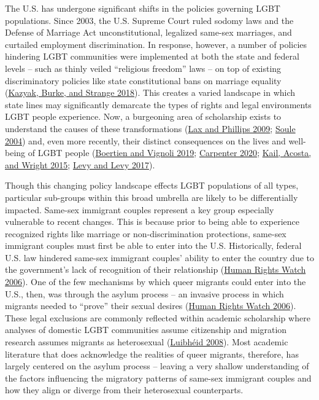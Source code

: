 \documentclass[
  11pt,
]{article}
\begin{document}
The U.S. has undergone significant shifts in the policies governing LGBT populations. Since 2003, the U.S. Supreme Court ruled sodomy laws and the Defense of Marriage Act unconstitutional, legalized same-sex marriages, and curtailed employment discrimination. In response, however, a number of policies hindering LGBT communities were implemented at both the state and federal levels -- such as thinly veiled ``religious freedom'' laws -- on top of existing discriminatory policies like state constitutional bans on marriage equality (\protect\hyperlink{ref-kazyak_2018}{Kazyak, Burke, and Strange 2018}). This creates a varied landscape in which state lines may significantly demarcate the types of rights and legal environments LGBT people experience. Now, a burgeoning area of scholarship exists to understand the causes of these transformations (\protect\hyperlink{ref-lax_2009}{Lax and Phillips 2009}; \protect\hyperlink{ref-soule_2004}{Soule 2004}) and, even more recently, their distinct consequences on the lives and well-being of LGBT people (\protect\hyperlink{ref-boertien_2019}{Boertien and Vignoli 2019}; \protect\hyperlink{ref-carpenter_2020}{Carpenter 2020}; \protect\hyperlink{ref-kail_2015}{Kail, Acosta, and Wright 2015}; \protect\hyperlink{ref-levy_2017}{Levy and Levy 2017}).

Though this changing policy landscape effects LGBT populations of all types, particular sub-groups within this broad umbrella are likely to be differentially impacted. Same-sex immigrant couples represent a key group especially vulnerable to recent changes. This is because prior to being able to experience recognized rights like marriage or non-discrimination protections, same-sex immigrant couples must first be able to enter into the U.S. Historically, federal U.S. law hindered same-sex immigrant couples' ability to enter the country due to the government's lack of recognition of their relationship (\protect\hyperlink{ref-humanrightswatch_2006}{Human Rights Watch 2006}). One of the few mechanisms by which queer migrants could enter into the U.S., then, was through the asylum process -- an invasive process in which migrants needed to ``prove'' their sexual desires (\protect\hyperlink{ref-humanrightswatch_2006}{Human Rights Watch 2006}). These legal exclusions are commonly reflected within academic scholarship where analyses of domestic LGBT communities assume citizenship and migration research assumes migrants as heterosexual (\protect\hyperlink{ref-luibheid_2008}{Luibhéid 2008}). Most academic literature that does acknowledge the realities of queer migrants, therefore, has largely centered on the asylum process -- leaving a very shallow understanding of the factors influencing the migratory patterns of same-sex immigrant couples and how they align or diverge from their heterosexual counterparts.
\end{document}
